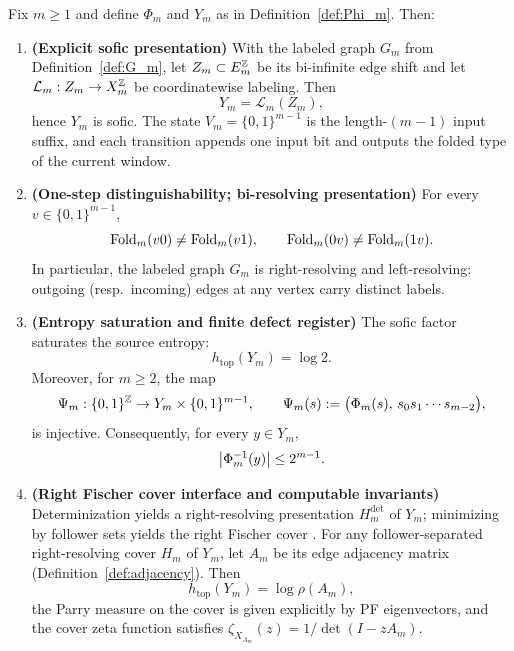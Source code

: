 \begin{theorem}\label{thm:phi-sofic-fischer}
Fix $m\ge 1$ and define $\Phi_m$ and $Y_m$ as in Definition~\ref{def:Phi_m}.
Then:
\begin{enumerate}
  \item \textbf{(Explicit sofic presentation)} With the labeled graph $G_m$ from Definition~\ref{def:G_m}, let $Z_m\subset E_m^{\mathbb{Z}}$ be its bi-infinite edge shift and let $\mathcal{L}_m:Z_m\to X_m^{\mathbb{Z}}$ be coordinatewise labeling. Then
  \[
  Y_m=\mathcal{L}_m(Z_m),
  \]
  hence $Y_m$ is sofic. The state $V_m=\{0,1\}^{m-1}$ is the length-$(m-1)$ input suffix, and each transition appends one input bit and outputs the folded type of the current window.
  \item \textbf{(One-step distinguishability; bi-resolving presentation)} For every $v\in\{0,1\}^{m-1}$,
  \[
  \mathrm{Fold}_m(v0)\neq \mathrm{Fold}_m(v1),
  \qquad
  \mathrm{Fold}_m(0v)\neq \mathrm{Fold}_m(1v).
  \]
  In particular, the labeled graph $G_m$ is right-resolving and left-resolving: outgoing (resp.\ incoming) edges at any vertex carry distinct labels.
  \item \textbf{(Entropy saturation and finite defect register)} The sofic factor saturates the source entropy:
  \[
  h_{\mathrm{top}}(Y_m)=\log 2.
  \]
  Moreover, for $m\ge 2$, the map
  \[
  \Psi_m:\{0,1\}^{\mathbb{Z}}\to Y_m\times \{0,1\}^{m-1},
  \qquad
  \Psi_m(s):=\bigl(\Phi_m(s),\,s_0s_1\cdots s_{m-2}\bigr),
  \]
  is injective. Consequently, for every $y\in Y_m$,
  \[
  \left\lvert \Phi_m^{-1}(y)\right\rvert\le 2^{m-1}.
  \]
  \item \textbf{(Right Fischer cover interface and computable invariants)} Determinization yields a right-resolving presentation $H_m^{\mathrm{det}}$ of $Y_m$; minimizing by follower sets yields the right Fischer cover \cite{LindMarcus1995,Kitchens1998SymbolicDynamics}.
  For any follower-separated right-resolving cover $H_m$ of $Y_m$, let $A_m$ be its edge adjacency matrix (Definition~\ref{def:adjacency}). Then
  \[
  h_{\mathrm{top}}(Y_m)=\log\rho(A_m),
  \]
  the Parry measure on the cover is given explicitly by PF eigenvectors, and the cover zeta function satisfies
  \(
  \zeta_{X_{A_m}}(z)=1/\det(I-zA_m).
  \)
\end{enumerate}
\end{theorem}

